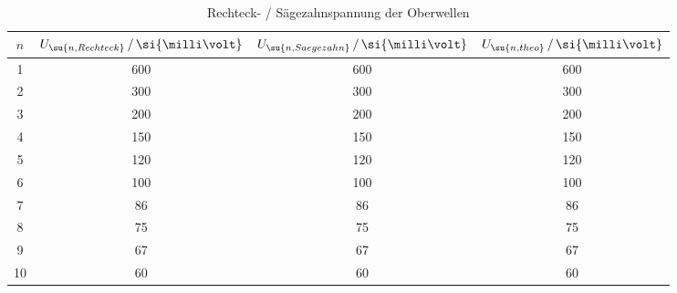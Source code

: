 \begin{table}
  \centering
  \begin{tabular}{c c c c}
    \toprule
    $n$ & $U_\su{n, Rechteck}\,/\,\si{\milli\volt}$ & $U_\su{n, Saegezahn}\,/\,\si{\milli\volt}$ &
     $U_\su{n, theo}\,/\,\si{\milli\volt}$ \\
    \midrule
    1 & 600   &  600  &  600  \\
    2 & 300   &  300  &  300  \\
    3 & 200   &  200  &  200  \\
    4 & 150   &  150  &  150  \\
    5 & 120   &  120  &  120  \\
    6 & 100   &  100  &  100  \\
    7 &  86   &  86   &  86   \\
    8 &  75   &  75   &  75   \\
    9 &  67   &  67   &  67   \\
   10 &  60   &  60   &  60   \\
    \bottomrule
  \end{tabular}
  \caption{Rechteck- / Sägezahnspannung der Oberwellen}
  \label{tab:rechtsäge}
\end{table}
